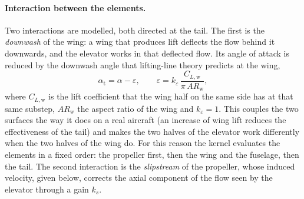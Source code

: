 \paragraph{Interaction between the elements.} Two interactions are modelled, both directed at the tail. The first is the \emph{downwash} of the wing: a wing that produces lift deflects the flow behind it downwards, and the elevator works in that deflected flow. Its angle of attack is reduced by the downwash angle that lifting-line theory predicts at the wing,
\begin{equation}
\alpha_{\mathrm{t}} = \alpha - \varepsilon, \qquad \varepsilon = k_{\varepsilon}\, \frac{C_{L,\mathrm{w}}}{\pi\, \mathit{AR}_{\mathrm{w}}},
\label{eq:aero-downwash}
\end{equation}
where $C_{L,\mathrm{w}}$ is the lift coefficient that the wing half on the same side has at that same substep, $\mathit{AR}_{\mathrm{w}}$ the aspect ratio of the wing and $k_{\varepsilon} = 1$. This couples the two surfaces the way it does on a real aircraft (an increase of wing lift reduces the effectiveness of the tail) and makes the two halves of the elevator work differently when the two halves of the wing do. For this reason the kernel evaluates the elements in a fixed order: the propeller first, then the wing and the fuselage, then the tail. The second interaction is the \emph{slipstream} of the propeller, whose induced velocity, given below, corrects the axial component of the flow seen by the elevator through a gain $k_s$.

